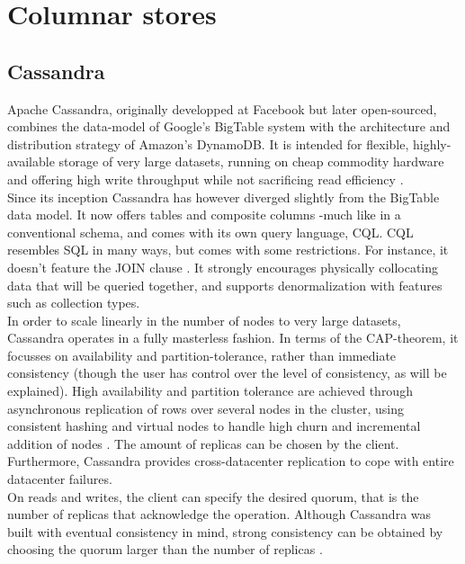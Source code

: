 \documentclass{article}
\begin{document}
\section{Columnar stores}
\subsection{Cassandra}

Apache Cassandra, originally developped at Facebook but later open-sourced, combines the data-model of Google's BigTable system with the architecture and distribution strategy of Amazon's DynamoDB. It is intended for flexible, highly-available storage of very large datasets, running on cheap commodity hardware and offering high write throughput while not sacrificing read efficiency \cite{lakshman2010cassandra}.
\\
Since its inception Cassandra has however diverged slightly from the BigTable data model. It now offers tables and composite columns -much like in a conventional schema, and comes with its own query language, CQL\cite{cassandra_then&now}. CQL resembles SQL in many ways, but comes with some restrictions. For instance, it doesn't feature the JOIN clause \cite{cassandra_cql}. It strongly encourages physically collocating data that will be queried together, and supports denormalization with features such as collection types.\\
In order to scale linearly in the number of nodes to very large datasets, Cassandra operates in a fully masterless fashion. In terms of the CAP-theorem, it focusses on availability and partition-tolerance, rather than immediate consistency (though the user has control over the level of consistency, as will be explained). High availability and partition tolerance are achieved through asynchronous replication of rows over several nodes in the cluster, using consistent hashing and virtual nodes to handle high churn and incremental addition of nodes \cite{decandia2007dynamo} \cite{lakshman2010cassandra} \cite{cassandra_then&now}. The amount of replicas can be chosen by the client. Furthermore, Cassandra provides cross-datacenter replication to cope with entire datacenter failures.
\\On reads and writes, the client can specify the desired quorum, that is the number of replicas that acknowledge the operation. Although Cassandra was built with eventual consistency in mind, strong consistency can be obtained by choosing the quorum larger than the number of replicas \cite{grolinger2013data}.\\
\end{document}
